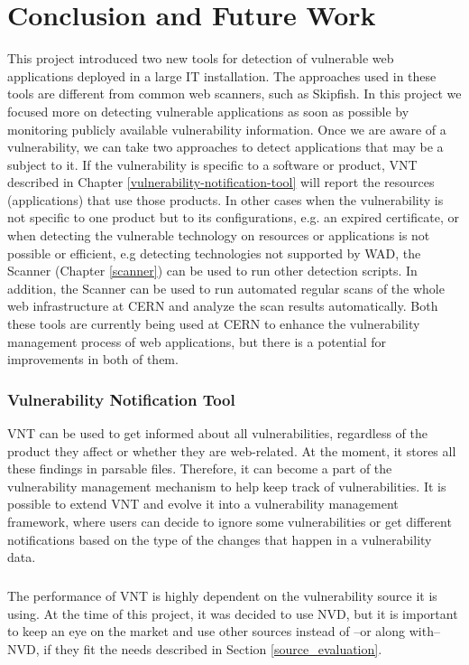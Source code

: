 \chapter{Conclusion and Future Work}
\label{conclusion-and-future-work}
\thispagestyle{empty}
This project introduced two new tools for detection of vulnerable web applications deployed in a large IT installation. The approaches used in these tools are different from common web scanners, such as Skipfish. In this project we focused more on detecting vulnerable applications as soon as possible by monitoring publicly available vulnerability information. Once we are aware of a vulnerability, we can take two approaches to detect applications that may be a subject to it. If the vulnerability is specific to a software or product, VNT described in Chapter \ref{vulnerability-notification-tool} will report the resources (applications) that use those products. In other cases when the vulnerability is not specific to one product but to its configurations, e.g. an expired certificate, or when detecting the vulnerable technology on resources or applications is not possible or efficient, e.g detecting technologies not supported by WAD, the Scanner (Chapter \ref{scanner}) can be used to run other detection scripts. In addition, the Scanner can be used to run automated regular scans of the whole web infrastructure at CERN and analyze the scan results automatically. Both these tools are currently being used at CERN to enhance the vulnerability management process of web applications, but there is a potential for improvements in both of them. 
 
\subsection{Vulnerability Notification Tool}
VNT can be used to get informed about all vulnerabilities, regardless of the product they affect or whether they are web-related. At the moment, it stores all these findings in parsable files. Therefore, it can become a part of the vulnerability management mechanism to help keep track of vulnerabilities. It is possible to extend VNT and evolve it into a vulnerability management framework, where users can decide to ignore some vulnerabilities or get different notifications based on the type of the changes that happen in a vulnerability data.
\paragraph{}
The performance of VNT is highly dependent on the vulnerability source it is using. At the time of this project, it was decided to use NVD,  but it is important to keep an eye on the market and use other sources instead of --or along with-- NVD, if they fit the needs described in Section \ref{source_evaluation}. 

